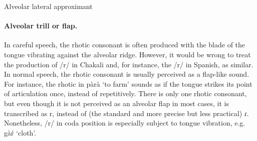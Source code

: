\begin{table}[!htb]
\small
\centering
\caption{Alveolar lateral approximant\label{tab:alveolar-lateral-approximant}}
\quad
{}
\end{table}


\paragraph{Alveolar trill or flap.}
\label{sec:flap}

 In careful speech,  the rhotic consonant is often produced with the blade 
of the tongue
vibrating against the alveolar ridge. However,
it would be wrong to treat  the production of /{\sls r}/ in Chakali  and, for 
instance,
the /{\sls r}/ in
Spanish, as similar. In normal speech,  the rhotic consonant is
usually perceived  as a flap-like sound. For instance,  the 
rhotic in {\sls pàrà} `to farm' sounds as if the tongue strikes its point of
articulation once, instead of repetitively. There is only one rhotic consonant,
but  even though it is not perceived as an alveolar flap in most cases, it is
transcribed as {\sls r},  instead of (the standard and more precise but less
practical) {\sls ɾ}.  Nonetheless,   /{\sls r}/ in coda position is especially 
subject to
tongue vibration, e.g. {\sls gàŕ} `cloth'. 

